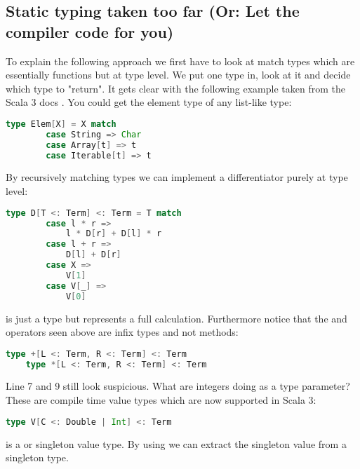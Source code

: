 \subsection{Static typing taken too far (Or: Let the compiler code for you)}
To explain the following approach we first have to look at match types which are essentially functions but at type level. We put one type in, look at it and decide which type to "return". It gets clear with the following example taken from the Scala 3 docs \cite{matchTypesScala3}. You could get the element type of any list-like type:
\begin{lstlisting}[language=scala]
    type Elem[X] = X match
        case String => Char
        case Array[t] => t
        case Iterable[t] => t
\end{lstlisting}
By recursively matching types we can implement a differentiator purely at type level:
\begin{lstlisting}[language=scala]
    type D[T <: Term] <: Term = T match
        case l * r => 
            l * D[r] + D[l] * r
        case l + r => 
            D[l] + D[r]
        case X => 
            V[1]
        case V[_] => 
            V[0]
\end{lstlisting}
 is just a type but represents a full calculation. Furthermore notice that the \lstscalainline{*} and \lstscalainline{+} operators seen above are infix types and not methods: 
\begin{lstlisting}[language=scala]
    type +[L <: Term, R <: Term] <: Term
    type *[L <: Term, R <: Term] <: Term
\end{lstlisting}
Line 7 and 9 still look suspicious. What are integers doing as a type parameter? These are compile time value types which are now supported in Scala 3:
\begin{lstlisting}[language=scala]
    type V[C <: Double | Int] <: Term
\end{lstlisting}
 is a  or  singleton value type. By using  we can extract the singleton value from a singleton type. 

